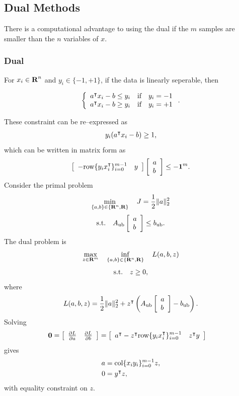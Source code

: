 \documentclass{article}
\begin{document}
\subsection{Dual Methods}
There is a computational advantage to using the dual if the $m$ samples are smaller than the $n$ variables of $x$.

\subsubsection{Dual}
    For $x_i\in\textbf{R}^n$ and $y_i\in\{-1,+1\}$,
    if the data is linearly seperable, then

    \begin{align*}
        \left\{\begin{array}{lllllllllllllllllll}
            a^\intercal x_i - b\leq y_i & \text{if}\quad y_i=-1\\
            a^\intercal x_i - b\geq y_i & \text{if}\quad y_i=+1
        \end{array}\right..
    \end{align*}

    These constraint can be re--expressed as
    \begin{align*}
        y_i(a^\intercal x_i - b)\geq 1,
    \end{align*}
    which can be written in matrix form as
    \begin{align*}
        \left[\begin{array}{lllllllllllllllllll}-\text{row}\{y_ix_i^\intercal\}_{i=0}^{m-1} & y\end{array}\right]\left[\begin{array}{lllllllllllllllllll}a\\ b\end{array}\right]\leq -\textbf{1}^m.
    \end{align*}
    Consider the primal problem
    \begin{align*}
        \min_{\{a,b\}\in\{\textbf{R}^n,\textbf{R}\}}\quad J = \frac{1}{2}\|a\|_2^2
    \end{align*}
    \begin{align*}
        \text{s.t.}\quad A_{\text{ub}}\left[\begin{array}{lllllllllllllllllll}a\\ b\end{array}\right]\leq b_{\text{ub}}.
    \end{align*}
    The dual problem is 
    \begin{align*}
        \max_{z\in\textbf{R}^m}\quad \inf_{\{a,b\}\in\{\textbf{R}^n,\textbf{R}\}}\quad L(a,b,z)
    \end{align*}
    \begin{align*}
        \text{s.t.}\quad z\geq 0,
    \end{align*}
    where
    \begin{align*}
        L(a,b,z) = \frac{1}{2}\|a\|_2^2 + z^\intercal \left(A_{\text{ub}} \left[\begin{array}{lllllllllllllllllll}a\\ b\end{array}\right]-b_{\text{ub}} \right).
    \end{align*}
    Solving
    \begin{align*}
        \textbf{0} = \left[\begin{array}{lllllllllllllllllll}\frac{\partial L}{\partial a} & \frac{\partial L}{\partial b} \end{array}\right]
        &= \left[\begin{array}{lllllllllllllllllll} a^\intercal - z^\intercal \text{row}\{y_ix_i^\intercal\}_{i=0}^{m-1} & z^\intercal y\end{array}\right]
    \end{align*}
    gives
    \begin{align*}
        a&=\text{col}\{x_i y_i\}_{i=0}^{m-1}z,\\
        0&= y^\intercal z,
    \end{align*}
    with equality constraint on $z$.
    
\end{document}
